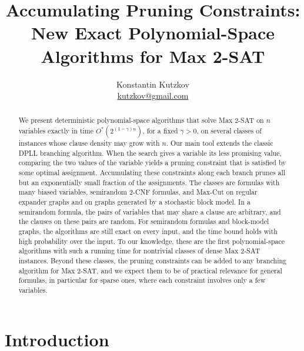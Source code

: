 \documentclass[11pt,a4paper]{article}
\title{Accumulating Pruning Constraints: \\
	New Exact Polynomial-Space Algorithms for Max 2-SAT\\[3pt]}
\author{Konstantin Kutzkov \\\url{kutzkov@gmail.com}}
\date{}
\theoremstyle{definition}
\theoremstyle{remark}
\newcommand{\Ostar}{O^{*}}
\begin{document}
\maketitle

\begin{abstract}
We present deterministic polynomial-space algorithms that solve Max 2-SAT
on $n$ variables exactly in time $\Ostar(2^{(1-\gamma)n})$, for a fixed
$\gamma>0$, on several classes of instances whose clause density may grow
with $n$. Our main tool extends the classic DPLL branching algorithm. When
the search gives a variable its less promising value, comparing the two
values of the variable yields a pruning constraint that is satisfied by
some optimal assignment. Accumulating these constraints along each branch
prunes all but an exponentially small fraction of the assignments. The classes are formulas with many biased variables,
semirandom 2-CNF formulas, and Max-Cut on regular expander graphs and on
graphs generated by a stochastic block model. In a semirandom formula, the
pairs of variables that may share a clause are arbitrary, and the clauses
on these pairs are random. For semirandom formulas and block-model graphs,
the algorithms are still exact on every input, and the time bound holds
with high probability over the input.
To our knowledge, these are the first polynomial-space algorithms with such
a running time for nontrivial classes of dense Max 2-SAT instances. Beyond these
classes, the pruning constraints can be added to any branching algorithm
for Max 2-SAT, and we expect them to be of practical relevance for general
formulas, in particular for sparse ones, where each constraint involves only
a few variables.
\end{abstract}

\section{Introduction}
\end{document}
